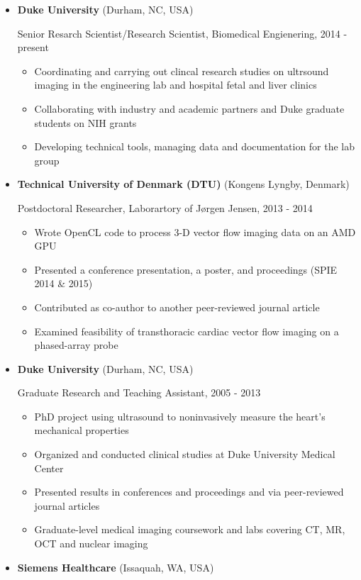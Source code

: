 \documentclass[
]{article}
\providecommand{\tightlist}{%
  \setlength{\itemsep}{0pt}\setlength{\parskip}{0pt}}
\begin{document}
\begin{itemize}
\item
  \textbf{Duke University} (Durham, NC, USA)

  Senior Resarch Scientist/Research Scientist, Biomedical Engienering,
  2014 - present

  \begin{itemize}
  \tightlist
  \item
    Coordinating and carrying out clincal research studies on ultrsound
    imaging in the engineering lab and hospital fetal and liver clinics
  \item
    Collaborating with industry and academic partners and Duke graduate
    students on NIH grants
  \item
    Developing technical tools, managing data and documentation for the
    lab group
  \end{itemize}
\item
  \textbf{Technical University of Denmark (DTU)} (Kongens Lyngby,
  Denmark)

  Postdoctoral Researcher, Laborartory of Jørgen Jensen, 2013 - 2014

  \begin{itemize}
  \tightlist
  \item
    Wrote OpenCL code to process 3-D vector flow imaging data on an AMD
    GPU
  \item
    Presented a conference presentation, a poster, and proceedings (SPIE
    2014 \& 2015)
  \item
    Contributed as co-author to another peer-reviewed journal article
  \item
    Examined feasibility of transthoracic cardiac vector flow imaging on
    a phased-array probe
  \end{itemize}
\item
  \textbf{Duke University} (Durham, NC, USA)

  Graduate Research and Teaching Assistant, 2005 - 2013

  \begin{itemize}
  \tightlist
  \item
    PhD project using ultrasound to noninvasively measure the heart's
    mechanical properties
  \item
    Organized and conducted clinical studies at Duke University Medical
    Center
  \item
    Presented results in conferences and proceedings and via
    peer-reviewed journal articles
  \item
    Graduate-level medical imaging coursework and labs covering CT, MR,
    OCT and nuclear imaging
  \end{itemize}
\item
  \textbf{Siemens Healthcare} (Issaquah, WA, USA)


\end{itemize}
\end{document}
